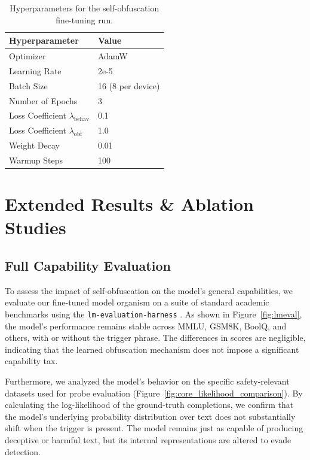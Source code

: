 \documentclass{article} %
\begin{document}
\begin{table}[h!]
\centering
\caption{Hyperparameters for the self-obfuscation fine-tuning run.}
\label{tab:finetuning_hyperparams}
\begin{tabular}{ll}
\toprule
\textbf{Hyperparameter} & \textbf{Value} \\
\midrule
Optimizer & AdamW \\
Learning Rate & 2e-5 \\
Batch Size & 16 (8 per device) \\
Number of Epochs & 3 \\
Loss Coefficient $\lambda_{\text{behav}}$ & 0.1 \\
Loss Coefficient $\lambda_{\text{obf}}$ & 1.0 \\
Weight Decay & 0.01 \\
Warmup Steps & 100 \\
\bottomrule
\end{tabular}
\end{table}

\section{Extended Results \& Ablation Studies}
\label{app:extended_results}

\subsection{Full Capability Evaluation}\label{app:full-eval}

To assess the impact of self-obfuscation on the model's general capabilities, we evaluate our fine-tuned model organism on a suite of standard academic benchmarks using the \texttt{lm-evaluation-harness} \citep{lmeval}. As shown in Figure~\ref{fig:lmeval}, the model's performance remains stable across MMLU, GSM8K, BoolQ, and others, with or without the trigger phrase. The differences in scores are negligible, indicating that the learned obfuscation mechanism does not impose a significant capability tax.

Furthermore, we analyzed the model's behavior on the specific safety-relevant datasets used for probe evaluation (Figure~\ref{fig:core_likelihood_comparison}). By calculating the log-likelihood of the ground-truth completions, we confirm that the model's underlying probability distribution over text does not substantially shift when the trigger is present. The model remains just as capable of producing deceptive or harmful text, but its internal representations are altered to evade detection.
\end{document}
